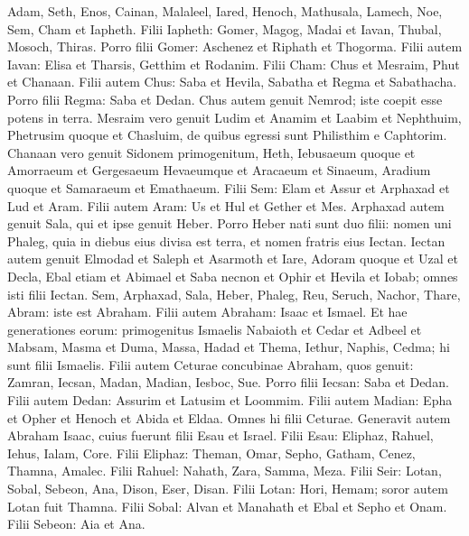 \begin{biblechapter}
 \verse Adam, Seth, Enos, 
\verse Cainan, Malaleel, Iared, 
\verse Henoch, Mathusala, Lamech, 
\verse Noe, Sem, Cham et Iapheth.
 \verse Filii Iapheth: Gomer, Magog, Madai et Iavan, Thubal, Mosoch, Thiras. 
\verse Porro filii Gomer: Aschenez et Riphath et Thogorma. 
\verse Filii autem Iavan: Elisa et Tharsis, Getthim et Rodanim.
 \verse Filii Cham: Chus et Mesraim, Phut et Chanaan. 
\verse Filii autem Chus: Saba et Hevila, Sabatha et Regma et Sabathacha. Porro filii Regma: Saba et Dedan. 
\verse Chus autem genuit Nemrod; iste coepit esse potens in terra. 
\verse Mesraim vero genuit Ludim et Anamim et Laabim et Nephthuim, 
\verse Phetrusim quoque et Chasluim, de quibus egressi sunt Philisthim e Caphtorim. 
\verse Chanaan vero genuit Sidonem primogenitum, Heth, 
\verse Iebusaeum quoque et Amorraeum et Gergesaeum 
\verse Hevaeumque et Aracaeum et Sinaeum, 
\verse Aradium quoque et Samaraeum et Emathaeum.
 \verse Filii Sem: Elam et Assur et Arphaxad et Lud et Aram. Filii autem Aram: Us et Hul et Gether et Mes. 
\verse Arphaxad autem genuit Sala, qui et ipse genuit Heber. 
\verse Porro Heber nati sunt duo filii: nomen uni Phaleg, quia in diebus eius divisa est terra, et nomen fratris eius Iectan. 
\verse Iectan autem genuit Elmodad et Saleph et Asarmoth et Iare, 
\verse Adoram quoque et Uzal et Decla, 
 \verse Ebal etiam et Abimael et Saba necnon 
\verse et Ophir et Hevila et Iobab; omnes isti filii Iectan.
 \verse Sem, Arphaxad, Sala, 
\verse Heber, Phaleg, Reu, 
\verse Seruch, Nachor, Thare, 
 \verse Abram: iste est Abraham.
 \verse Filii autem Abraham: Isaac et Ismael. 
\verse Et hae generationes eorum: primogenitus Ismaelis Nabaioth et Cedar et Adbeel et Mabsam, 
\verse Masma et Duma, Massa, Hadad et Thema, 
\verse Iethur, Naphis, Cedma; hi sunt filii Ismaelis.
 \verse Filii autem Ceturae concubinae Abraham, quos genuit: Zamran, Iecsan, Madan, Madian, Iesboc, Sue. Porro filii Iecsan: Saba et Dedan. Filii autem Dedan: Assurim et Latusim et Loommim. 
\verse Filii autem Madian: Epha et Opher et Henoch et Abida et Eldaa. Omnes hi filii Ceturae.
 \verse Generavit autem Abraham Isaac, cuius fuerunt filii Esau et Israel.
 \verse Filii Esau: Eliphaz, Rahuel, Iehus, Ialam, Core. 
\verse Filii Eliphaz: Theman, Omar, Sepho, Gatham, Cenez, Thamna, Amalec. 
\verse Filii Rahuel: Nahath, Zara, Samma, Meza.
 \verse Filii Seir: Lotan, Sobal, Sebeon, Ana, Dison, Eser, Disan. 
\verse Filii Lotan: Hori, Hemam; soror autem Lotan fuit Thamna. 
\verse Filii Sobal: Alvan et Manahath et Ebal et Sepho et Onam. Filii Sebeon: Aia et Ana. 

\end{biblechapter}
